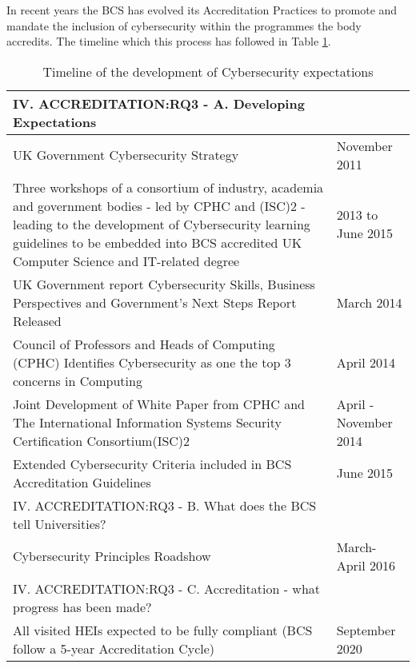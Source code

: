 \documentclass[conference]{IEEEtran}
\begin{document}
In recent years the BCS has evolved its Accreditation Practices to promote and mandate the inclusion of cybersecurity within the programmes the body accredits. The timeline which this process has followed in Table \ref{table:1}.
  \begin{table}[h!]
  \caption{Timeline of the development of Cybersecurity expectations}
  \label{table:1}
  \begin{tabular}{ | p{6cm} |p{1.5cm} |}
    \hline
    IV. ACCREDITATION:RQ3 - A. Developing Expectations &   \\ \hline
    UK Government Cybersecurity Strategy \cite{UKCabinetOffice} & November 2011 \\ \hline
    Three workshops of a consortium of industry, academia and government bodies - led by CPHC and (ISC)2 - leading to the development of Cybersecurity learning guidelines to be embedded into BCS accredited UK Computer Science and IT-related degree \cite{CPHCISC2}  & 2013 to June 2015 \\ \hline
    UK Government report Cybersecurity Skills, Business Perspectives and Government's Next Steps Report Released \cite{UKCabinetOffice2014} & March 2014  \\ \hline
    Council of Professors and Heads of Computing (CPHC) Identifies Cybersecurity as one the top 3 concerns in Computing & April 2014 \\ \hline
    Joint Development of White Paper from CPHC and The International Information Systems Security Certification Consortium(ISC)2 \cite{CPHCISC2014} & April -November 2014 \\ \hline
    Extended Cybersecurity Criteria included in BCS Accreditation Guidelines \cite{BCS2018a}& June 2015 \\
    \hline
    IV. ACCREDITATION:RQ3 - B. What does the BCS tell Universities? & \\ \hline
    Cybersecurity Principles Roadshow & March-April 2016 \\ \hline
    IV. ACCREDITATION:RQ3 - C. Accreditation - what progress has been made? &  \\ \hline
    All visited HEIs expected to be fully compliant 
 (BCS follow a 5-year Accreditation Cycle)  & September 2020\\ \hline
  \end{tabular}
  \end{table}
\end{document}
